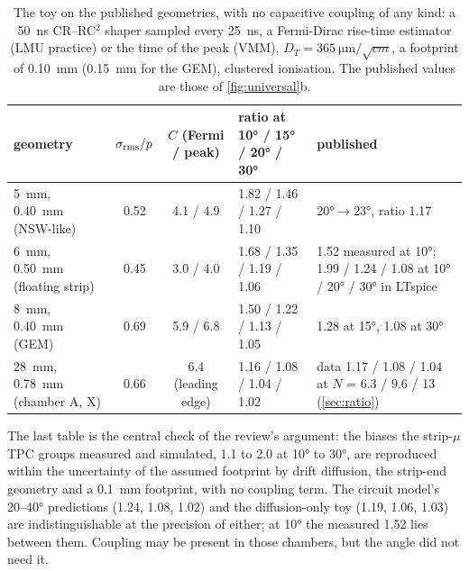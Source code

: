 \begin{table}[h]
  \centering\footnotesize
  \caption{The toy on the published geometries, with no capacitive coupling of any kind: a 50~ns CR--RC$^2$ shaper sampled every
  25~ns, a Fermi-Dirac rise-time estimator (LMU practice) or the time of the peak (VMM), $D_T = \SI{365}{\micro\metre\per\sqrt{cm}}$, a
  footprint of 0.10~mm (0.15~mm for the GEM), clustered ionisation. The published values are those of \cref{fig:universal}b.}
  \label{tab:toydet}
  \begin{tabular}{@{}p{3.1cm}ccp{3.3cm}p{5.0cm}@{}}
    \toprule
    geometry & $\sigma_{\rm rms}/p$ & $C$ (Fermi / peak) & ratio at \ang{10} / \ang{15} / \ang{20} / \ang{30} & published \\
    \midrule
    5~mm, 0.40~mm (NSW-like) & 0.52 & 4.1 / 4.9 & 1.82 / 1.46 / 1.27 / 1.10 & \ang{20}$\to$\ang{23}, ratio 1.17~\cite{Iodice2015} \\
    6~mm, 0.50~mm (floating strip) & 0.45 & 3.0 / 4.0 & 1.68 / 1.35 / 1.19 / 1.06 & 1.52 measured at \ang{10}; 1.99 / 1.24 / 1.08 at \ang{10} / \ang{20} / \ang{30} in LTspice~\cite{Bortfeldt2014} \\
    8~mm, 0.40~mm (GEM) & 0.69 & 5.9 / 6.8 & 1.50 / 1.22 / 1.13 / 1.05 & 1.28 at \ang{15}, 1.08 at \ang{30}~\cite{Flierl2018} \\
    28~mm, 0.78~mm (chamber A, X) & 0.66 & 6.4 (leading edge) & 1.16 / 1.08 / 1.04 / 1.02 & data 1.17 / 1.08 / 1.04 at $N$ = 6.3 / 9.6 / 13 (\cref{sec:ratio}) \\
    \bottomrule
  \end{tabular}
\end{table}

The last table is the central check of the review's argument: the biases the strip-$\mu$TPC groups measured and simulated,
1.1 to 2.0 at \ang{10} to \ang{30}, are reproduced within the uncertainty of the assumed footprint by drift diffusion, the strip-end
geometry and a 0.1~mm footprint, with no coupling term. The circuit model's 20--\ang{40} predictions (1.24, 1.08, 1.02) and the
diffusion-only toy (1.19, 1.06, 1.03) are indistinguishable at the precision of either; at \ang{10} the measured 1.52 lies between
them. Coupling may be present in those chambers, but the angle did not need it.
